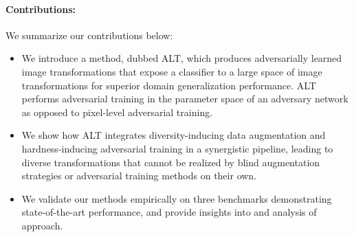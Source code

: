 \paragraph{Contributions:}
We summarize our contributions below:
\begin{itemize}[nosep,noitemsep,leftmargin=*]
    \item We introduce a method, dubbed ALT, which produces adversarially learned image transformations that expose a classifier to a large space of image transformations for superior domain generalization performance. ALT performs adversarial training in the parameter space of an adversary network as opposed to pixel-level adversarial training.
    \item We show how ALT integrates diversity-inducing data augmentation and hardness-inducing adversarial training in a synergistic pipeline, leading to diverse transformations that cannot be realized by blind augmentation strategies or adversarial training methods on their own.
    \item We validate our methods empirically on three benchmarks demonstrating state-of-the-art performance, and provide insights into and analysis of approach.
\end{itemize}

